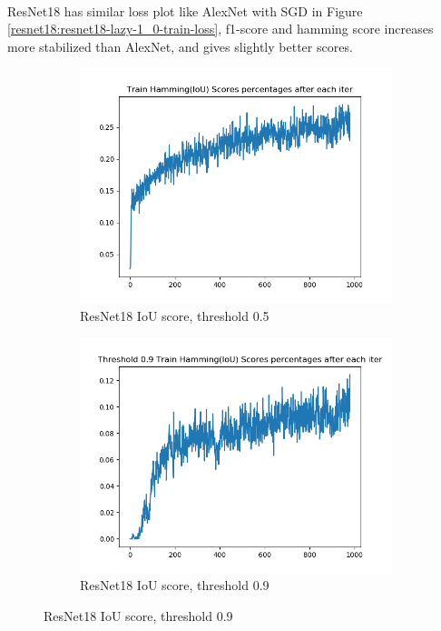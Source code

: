 \documentclass[12pt]{article}
\begin{document}
\paragraph{}ResNet18 has similar loss plot like AlexNet with SGD in Figure \ref{resnet18:resnet18-lazy-1_0-train-loss}, f1-score and hamming score increases more stabilized than AlexNet, and gives slightly better scores. 
\begin{figure}[!ht]
\centering
\begin{subfigure}{.5\textwidth}
	\centering
	\includegraphics[width=1\linewidth]{resnet18-lazy-1_0-train-scores-hs.png}
	\caption{ \label{resnet18:resnet18-lazy-1.0-train-scores-hs-5}ResNet18 IoU score, threshold 0.5}
\end{subfigure}%
\begin{subfigure}{.5\textwidth}
	\centering
	\includegraphics[width=1\linewidth]{resnet18-lazy-1_0-train-scores-hs-9.png}
	\caption{\label{resnet18:resnet18-lazy-1.0-train-scores-hs-9}ResNet18 IoU score, threshold 0.9}
\end{subfigure}
\end{figure}
\end{document}
